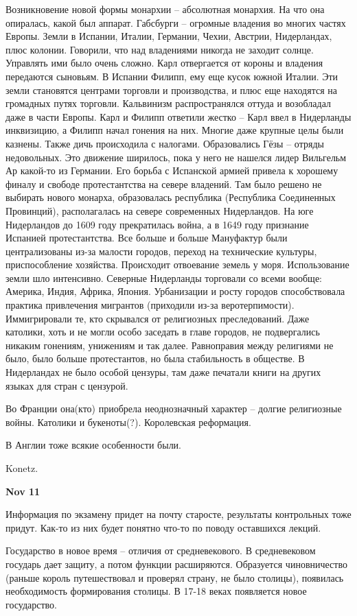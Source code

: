 \documentclass[a4paper, 12pt]{article}
\def\dateis#1{\vspace{\baselineskip}\hfill\textbf{#1}\par}
\begin{document}
\begin{multicols}{2}
Возникновение новой формы монархии -- абсолютная монархия. На что она опиралась, какой был аппарат. Габсбурги -- огромные владения во многих частях Европы. Земли в Испании, Италии, Германии, Чехии, Австрии, Нидерландах, плюс колонии. Говорили, что над владениями никогда не заходит солнце. Управлять ими было очень сложно. Карл отвергается от короны и владения передаются сыновьям. В Испании Филипп, ему еще кусок южной Италии. Эти земли становятся центрами торговли и производства, и плюс еще находятся на громадных путях торговли. Кальвинизм распространялся оттуда и возобладал даже в части Европы. Карл и Филипп ответили жестко -- Карл ввел в Нидерланды инквизицию, а Филипп начал гонения на них. Многие даже крупные целы были казнены. Также дичь происходила с налогами. Образовались Гёзы -- отряды недовольных. Это движение ширилось, пока у него не нашелся лидер Вильгельм Ар какой-то из Германии. Его борьба с Испанской армией привела к хорошему финалу и свободе протестантства на севере владений. Там было решено не выбирать нового монарха, образовалась республика (Республика Соединенных Провинций), располагалась на севере современных Нидерландов. На юге Нидерландов до 1609 году прекратилась война, а в 1649 году признание Испанией протестантства. Все больше и больше Мануфактур были централизованы из-за малости городов, переход на технические культуры, приспособление хозяйства. Происходит отвоевание земель у моря. Использование земли шло интенсивно. Северные Нидерланды торговали со всеми вообще: Америка, Индия, Африка, Япония. Урбанизации и росту городов способствовала практика привлечения мигрантов (приходили из-за веротерпимости). Иммигрировали те, кто скрывался от религиозных преследований. Даже католики, хоть и не могли особо заседать в главе городов, не подвергались никаким гонениям, унижениям и так далее. Равноправия между религиями не было, было больше протестантов, но была стабильность в обществе. В Нидерландах не было особой цензуры, там даже печатали книги на других языках для стран с цензурой. 

Во Франции она(кто) приобрела неоднозначный характер -- долгие религиозные войны. Католики и букеноты(?). Королевская реформация. 

В Англии тоже всякие особенности были. 

Konetz.

\dateis{Nov 11}
Информация по экзамену придет на почту старосте, результаты контрольных тоже придут. Как-то из них будет понятно что-то по поводу оставшихся лекций. 

Государство в новое время -- отличия от средневекового. В средневековом государь дает защиту, а потом функции расширяются. Образуется чиновничество (раньше король путешествовал и проверял страну, не было столицы), появилась необходимость формирования столицы. В 17-18 веках появляется новое государство. 


\end{multicols}
\end{document}
